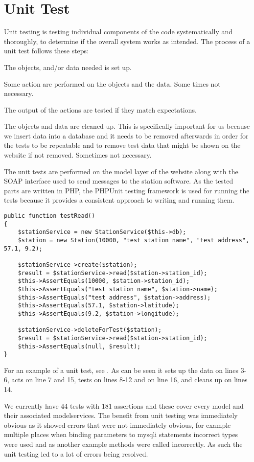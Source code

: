 \section{Unit Test}
Unit testing is testing individual components of the code systematically and thoroughly, to determine if the overall system works as intended.
The process of a unit test follows these steps:

\begin{description}[style=nextline]
\item[Set Up] The objects, and/or data needed is set up.
\item[Action] Some action are performed on the objects and the data.
Some times not necessary.
\item[Test] The output of the actions are tested if they match expectations.
\item[Tear Down/Clean Up] The objects and data are cleaned up. This is specifically important for us because we insert data into a database and it needs to be removed afterwards in order for the tests to be repeatable and to remove test data that might be shown on the website if not removed. 
Sometimes not necessary.
\end{description}

The unit tests are performed on the model layer of the website along with the SOAP interface used to send messages to the station software.
As the tested parts are written in PHP, the PHPUnit testing framework is used for running the tests because it provides a consistent approach to writing and running them.

\begin{lstlisting}[caption = {Example of a unit test}, label = {lst:unitTestExample}]
public function testRead()
{
	$stationService = new StationService($this->db);
	$station = new Station(10000, "test station name", "test address", 57.1, 9.2);

	$stationService->create($station);
	$result = $stationService->read($station->station_id);
	$this->AssertEquals(10000, $station->station_id);
	$this->AssertEquals("test station name", $station->name);
	$this->AssertEquals("test address", $station->address);
	$this->AssertEquals(57.1, $station->latitude);
	$this->AssertEquals(9.2, $station->longitude);

	$stationService->deleteForTest($station);
	$result = $stationService->read($station->station_id);
	$this->AssertEquals(null, $result);
}
\end{lstlisting}

For an example of a unit test, see .
As can be seen it sets up the data on lines 3-6, acts on line 7 and 15, tests on lines 8-12 and on line 16, and cleans up on lines 14.

We currently have 44 tests with 181 assertions and these cover every model and their associated modelservices. 
The benefit from unit testing was immediately obvious as it showed errors that were not immediately obvious, for example multiple places when binding parameters to mysqli statements incorrect types were used and as another example methods were called incorrectly.
As such the unit testing led to a lot of errors being resolved.

